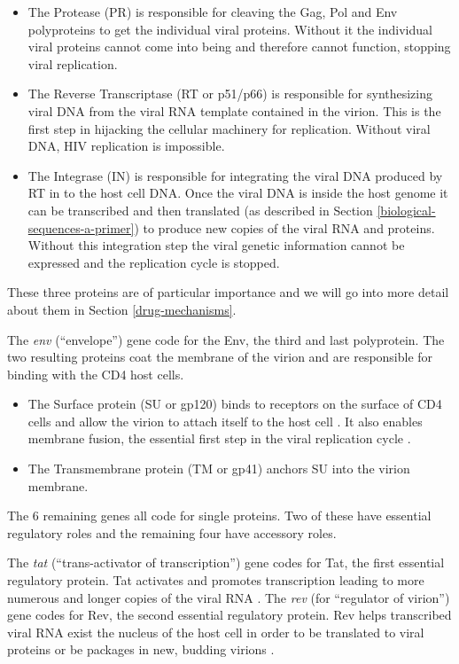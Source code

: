 \documentclass[
  11pt,
  twoside]{scrbook}
\begin{document}
\begin{itemize}
\item
  The Protease (PR) is responsible for cleaving the Gag, Pol and Env polyproteins to get the individual viral proteins. Without it the individual viral proteins cannot come into being and therefore cannot function, stopping viral replication.
\item
  The Reverse Transcriptase (RT or p51/p66) is responsible for synthesizing viral DNA from the viral RNA template contained in the virion. This is the first step in hijacking the cellular machinery for replication. Without viral DNA, HIV replication is impossible.
\item
  The Integrase (IN) is responsible for integrating the viral DNA produced by RT in to the host cell DNA. Once the viral DNA is inside the host genome it can be transcribed and then translated (as described in Section \ref{biological-sequences-a-primer}) to produce new copies of the viral RNA and proteins. Without this integration step the viral genetic information cannot be expressed and the replication cycle is stopped.
\end{itemize}

These three proteins are of particular importance and we will go into more detail about them in Section \ref{drug-mechanisms}.

The \emph{env} (``envelope'') gene code for the Env, the third and last polyprotein. The two resulting proteins coat the membrane of the virion and are responsible for binding with the CD4 host cells.

\begin{itemize}
\item
  The Surface protein (SU or gp120) binds to receptors on the surface of CD4 cells and allow the virion to attach itself to the host cell \autocite{bourHumanImmunodeficiencyVirus1995}. It also enables membrane fusion, the essential first step in the viral replication cycle \autocite{hernandezViruscellCellcellFusion1996}.
\item
  The Transmembrane protein (TM or gp41) anchors SU into the virion membrane.
\end{itemize}

The 6 remaining genes all code for single proteins. Two of these have essential regulatory roles and the remaining four have accessory roles.

The \emph{tat} (``trans-activator of transcription'') gene codes for Tat, the first essential regulatory protein. Tat activates and promotes transcription leading to more numerous and longer copies of the viral RNA \autocite{jonesControlRnaInitiation1994}. The \emph{rev} (for ``regulator of virion'') gene codes for Rev, the second essential regulatory protein. Rev helps transcribed viral RNA exist the nucleus of the host cell in order to be translated to viral proteins or be packages in new, budding virions \autocite{hopeViralRNAExport1997}.
\end{document}
